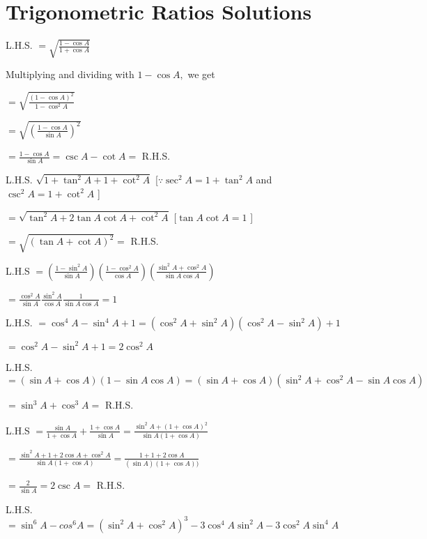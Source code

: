 \chapter{Trigonometric Ratios Solutions}
\startitemize[n, 1*broad]
\item L.H.S. $= \sqrt{\frac{1- \cos A}{1 + \cos A}}$

   Multiplying and dividing with $1 - \cos A,$ we get

   $= \sqrt{\frac{(1 - \cos A)^2}{1 - \cos^2 A}}$

   $= \sqrt{\left(\frac{1 - \cos A}{\sin A}\right)^2}$

   $= \frac{1 - \cos A}{\sin A} = \csc A - \cot A =$ R.H.S.

\item L.H.S. $\sqrt{1 + \tan^2A + 1 + \cot^2A}$ [$\because \sec^2A = 1 + \tan^2A$ and $\csc^2A = 1 + \cot^2 A$ ]

   $= \sqrt{\tan^2A + 2\tan A\cot A + \cot^2A}$ [$\tan A\cot A = 1$ ]

   $= \sqrt{(\tan A + \cot A)^2} =$ R.H.S.

\item L.H.S $= \left(\frac{1 - \sin^2 A}{\sin A}\right)\left(\frac{1 - \cos^2 A}{\cos A}\right)\left(\frac{\sin^2A +
   \cos^2A}{\sin A \cos A}\right)$

   $= \frac{\cos^2A}{\sin A}\frac{\sin^2 A}{\cos A}\frac{1}{\sin A \cos A} = 1$

\item L.H.S. $= \cos^4A - \sin^4A  + 1= (\cos^2A + \sin^2A)(\cos^2A - \sin^2A) + 1$

   $= \cos^2A - \sin^2A + 1 = 2\cos^2A$

\item L.H.S. $= (\sin A + \cos A)(1 - \sin A\cos A) = (\sin A + \cos A)(\sin^2A + \cos^2A - \sin A\cos A)$

   $= \sin^3A + \cos^3A =$ R.H.S.

\item L.H.S $= \frac{\sin A}{1 + \cos A}+\frac{1 + \cos A}{\sin A} = \frac{\sin^2A + (1 + \cos A)^2}{\sin A(1 + \cos A)}$

   $= \frac{\sin^2A + 1 + 2\cos A + \cos^2A}{\sin A(1 + \cos A)} = \frac{1 + 1 + 2\cos A}{(\sin A)(1 + \cos A))}$

   $= \frac{2}{\sin A} = 2\csc A =$ R.H.S.

\item L.H.S. $= \sin^6A - cos^6A = (\sin^2A + \cos^2A)^3 - 3\cos^4A\sin^2A - 3\cos^2A\sin^4A$

